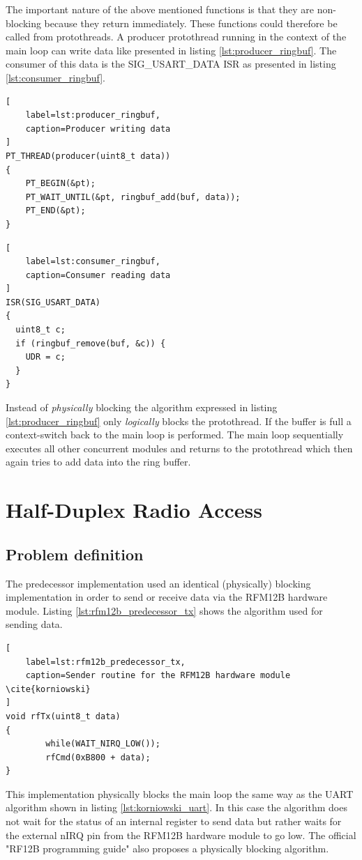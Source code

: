 The important nature of the above mentioned functions is that they are non-blocking because they return immediately. These functions could therefore be called from protothreads. A producer protothread running in the context of the main loop can write data like presented in listing \ref{lst:producer_ringbuf}. The consumer of this data is the SIG\_USART\_DATA ISR as presented in listing \ref{lst:consumer_ringbuf}.

\begin{lstlisting}[
    label=lst:producer_ringbuf,
    caption=Producer writing data
]
PT_THREAD(producer(uint8_t data))
{
    PT_BEGIN(&pt);
    PT_WAIT_UNTIL(&pt, ringbuf_add(buf, data));
    PT_END(&pt);
}
\end{lstlisting}

\begin{lstlisting}[
    label=lst:consumer_ringbuf,
    caption=Consumer reading data
]
ISR(SIG_USART_DATA)
{
  uint8_t c;
  if (ringbuf_remove(buf, &c)) {
    UDR = c;
  }
}
\end{lstlisting}

Instead of \emph{physically} blocking the algorithm expressed in listing \ref{lst:producer_ringbuf} only \emph{logically} blocks the protothread. If the buffer is full a context-switch back to the main loop is performed. The main loop sequentially executes all other concurrent modules and returns to the protothread which then again tries to add data into the ring buffer.

\section{Half-Duplex Radio Access}%
\label{sec:petri}
\subsection{Problem definition} %
The predecessor implementation used an identical (physically) blocking implementation in order to send or receive data via the RFM12B hardware module. Listing \ref{lst:rfm12b_predecessor_tx} shows the algorithm used for sending data.

\begin{lstlisting}[
    label=lst:rfm12b_predecessor_tx,
    caption=Sender routine for the RFM12B hardware module \cite{korniowski}
]
void rfTx(uint8_t data)
{
        while(WAIT_NIRQ_LOW());
        rfCmd(0xB800 + data);
}
\end{lstlisting}

This implementation physically blocks the main loop the same way as the UART algorithm shown in listing \ref{lst:korniowski_uart}. In this case the algorithm does not wait for the status of an internal register to send data but rather waits for the external nIRQ pin from the RFM12B hardware module to go low. The official "RF12B programming guide" \cite{rf12b_programming_guide} also proposes a physically blocking algorithm.

